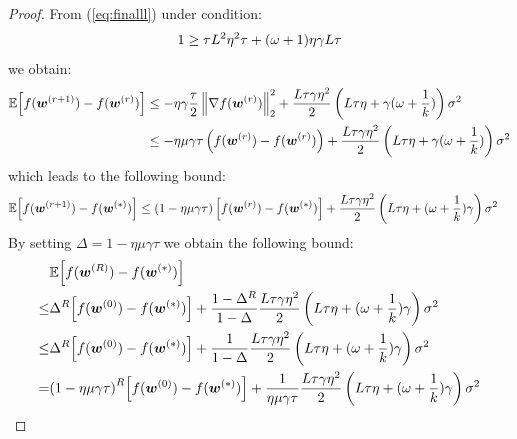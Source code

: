 \documentclass[sigconf, anonymous, review]{acmart}
\begin{document}
\begin{proof}
From (\ref{eq:finalll}) under condition:
\begin{align}\notag
       1\geq {\tau L^2\eta^2\tau}+{{(\omega+1)}\eta\gamma L}{\tau} 
\end{align}
we obtain:
\begin{align}\notag
         \mathbb{E}\Big[f({\boldsymbol{w}}^{(r+1)})-f({\boldsymbol{w}}^{(r)})\Big]&\leq -\eta\gamma\frac{\tau}{2}\left\|\nabla f({\boldsymbol{w}}^{(r)})\right\|_2^2+\frac{L\tau\gamma\eta^2 }{2}\left(L\tau\eta+\gamma(\omega+\frac{1}{k})\right)\sigma^2\nonumber\\
         &\leq -\eta\mu\gamma{\tau} \left(f({\boldsymbol{w}}^{(r)})-f({\boldsymbol{w}}^{(r)})\right)+\frac{L\tau\gamma\eta^2 }{2}\left(L\tau\eta+\gamma(\omega+\frac{1}{k})\right)\sigma^2 
\end{align}
which leads to the following bound:
\begin{align}\notag
            \mathbb{E}\Big[f({\boldsymbol{w}}^{(r+1)})-f({\boldsymbol{w}}^{(*)})\Big]&\leq \left(1-\eta\mu\gamma{\tau}\right) \Big[f({\boldsymbol{w}}^{(r)})-f({\boldsymbol{w}}^{(*)})\Big]+\frac{L\tau\gamma\eta^2 }{2}\left(L\tau\eta+{(\omega+\frac{1}{k})}\gamma\right)\sigma^2
\end{align}
By setting $\Delta=1-\eta\mu\gamma{\tau}$ we obtain  the following bound:
\begin{align}\notag
            &\mathbb{E}\Big[f({\boldsymbol{w}}^{(R)})-f({\boldsymbol{w}}^{(*)})\Big]\nonumber\\
            \leq& \Delta^R \Big[f({\boldsymbol{w}}^{(0)})-f({\boldsymbol{w}}^{(*)})\Big]+\frac{1-\Delta^R}{1-\Delta}\frac{L\tau\gamma\eta^2 }{2}\left(L\tau\eta+{(\omega+\frac{1}{k})}\gamma\right)\sigma^2\nonumber\\
            \leq& \Delta^R \Big[f({\boldsymbol{w}}^{(0)})-f({\boldsymbol{w}}^{(*)})\Big]+\frac{1}{1-\Delta}\frac{L\tau\gamma\eta^2 }{2}\left(L\tau\eta+{(\omega+\frac{1}{k})}\gamma\right)\sigma^2\nonumber\\
            =&{\left(1-\eta\mu\gamma{\tau}\right)}^R \Big[f({\boldsymbol{w}}^{(0)})-f({\boldsymbol{w}}^{(*)})\Big]+\frac{1}{\eta\mu\gamma{\tau}}\frac{L\tau\gamma\eta^2 }{2}\left(L\tau\eta+{(\omega+\frac{1}{k})}\gamma\right)\sigma^2
\end{align}
\end{proof}
\end{document}
